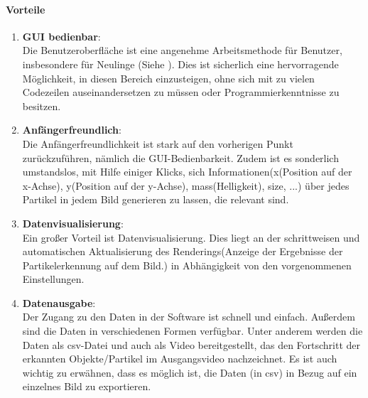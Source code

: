 	\paragraph{Vorteile}
		\begin{enumerate}
    			\item \textbf{GUI bedienbar}: \\
				Die Benutzeroberfläche ist eine angenehme Arbeitsmethode  für Benutzer, insbesondere für Neulinge (Siehe \cite{hertzum1996browsing}). Dies ist sicherlich eine hervorragende Möglichkeit, in diesen Bereich einzusteigen, ohne sich mit zu vielen Codezeilen auseinandersetzen zu müssen oder Programmierkenntnisse zu besitzen.
				
    			\item \textbf{Anfängerfreundlich}:\\
				Die Anfängerfreundlichkeit ist stark auf den vorherigen Punkt zurückzuführen, nämlich die GUI-Bedienbarkeit. Zudem ist es sonderlich umstandslos, mit Hilfe einiger Klicks, sich Informationen(x(Position auf der x-Achse), y(Position auf der y-Achse), mass(Helligkeit), size, ...) über jedes Partikel in jedem Bild generieren zu lassen, die relevant sind.    
				
    			\item \textbf{Datenvisualisierung}:\\
    			Ein großer Vorteil ist Datenvisualisierung. Dies liegt an der schrittweisen und automatischen Aktualisierung des Renderings(Anzeige der Ergebnisse der Partikelerkennung auf dem Bild.) in Abhängigkeit von den vorgenommenen Einstellungen.%
    			
    			\item \textbf{Datenausgabe}:\\
 				Der Zugang zu den Daten in der Software ist schnell und einfach. Außerdem sind die Daten in verschiedenen Formen verfügbar. Unter anderem werden die Daten als csv-Datei und auch als Video bereitgestellt, das den Fortschritt der erkannten Objekte/Partikel im Ausgangsvideo nachzeichnet. 
Es ist auch wichtig zu erwähnen, dass es möglich ist, die Daten (in csv) in Bezug auf ein einzelnes Bild zu exportieren.
		\end{enumerate}
		
